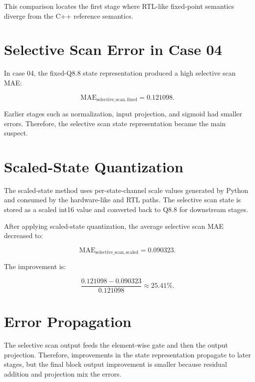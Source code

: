 This comparison locates the first stage where RTL-like fixed-point semantics diverge from the C++ reference semantics.

\section{Selective Scan Error in Case 04}

In case 04, the fixed-Q8.8 state representation produced a high selective scan MAE:

\begin{equation}
  \mathrm{MAE}_{\mathrm{selective\_scan, fixed}} = 0.121098.
\end{equation}

Earlier stages such as normalization, input projection, and sigmoid had smaller errors. Therefore, the selective scan state representation became the main suspect.

\section{Scaled-State Quantization}

The scaled-state method uses per-state-channel scale values generated by Python and consumed by the hardware-like and RTL paths. The selective scan state is stored as a scaled int16 value and converted back to Q8.8 for downstream stages.

After applying scaled-state quantization, the average selective scan MAE decreased to:

\begin{equation}
  \mathrm{MAE}_{\mathrm{selective\_scan, scaled}} = 0.090323.
\end{equation}

The improvement is:

\begin{equation}
  \frac{0.121098 - 0.090323}{0.121098} \approx 25.41\%.
\end{equation}

\section{Error Propagation}

The selective scan output feeds the element-wise gate and then the output projection. Therefore, improvements in the state representation propagate to later stages, but the final block output improvement is smaller because residual addition and projection mix the errors.

